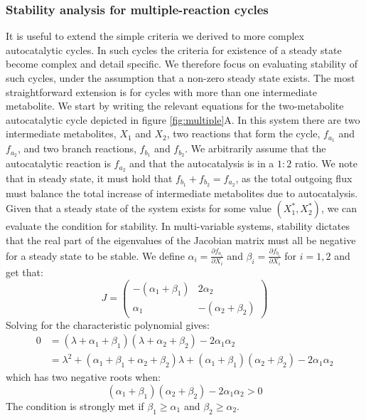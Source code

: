     \subsubsection{Stability analysis for multiple-reaction cycles}
    It is useful to extend the simple criteria we derived to more complex autocatalytic cycles.
    In such cycles the criteria for existence of a steady state become complex and detail specific.
    We therefore focus on evaluating stability of such cycles, under the assumption that a non-zero steady state exists.
    The most straightforward extension is for cycles with more than one intermediate metabolite.
    We start by writing the relevant equations for the two-metabolite autocatalytic cycle depicted in figure \ref{fig:multiple}A.
    In this system there are two intermediate metabolites, $X_1$ and $X_2$, two reactions that form the cycle, $f_{a_1}$ and $f_{a_2}$, and two branch reactions, $f_{b_1}$ and $f_{b_2}$.
    We arbitrarily assume that the autocatalytic reaction is $f_{a_2}$ and that the autocatalysis is in a $1:2$ ratio.
    We note that in steady state, it must hold that $f_{b_1}+f_{b_2}=f_{a_2}$, as the total outgoing flux must balance the total increase of intermediate metabolites due to autocatalysis.
    Given that a steady state of the system exists for some value $(X_1^*,X_2^*)$, we can evaluate the condition for stability.
    In multi-variable systems, stability dictates that the real part of the eigenvalues of the Jacobian matrix must all be negative for a steady state to be stable.
    We define $\alpha_i=\frac{\partial f_{a_i}}{\partial X_i}$ and $\beta_i=\frac{\partial f_{b_i}}{\partial X_i}$ for $i=1,2$ and get that:
    \begin{equation*}
        J=
        \begin{pmatrix}
            -(\alpha_1+\beta_1) & 2\alpha_2 \\
            \alpha_1 & -(\alpha_2+\beta_2)
        \end{pmatrix}
    \end{equation*}
    Solving for the characteristic polynomial gives:
    \begin{align*}
        0 & =(\lambda+\alpha_1+\beta_1)(\lambda+\alpha_2+\beta_2)-2\alpha_1\alpha_2 \\
        & = \lambda^2+(\alpha_1+\beta_1+\alpha_2+\beta_2)\lambda+(\alpha_1+\beta_1)(\alpha_2+\beta_2)-2\alpha_1\alpha_2
    \end{align*}
    which has two negative roots when:
    \begin{equation*}
        (\alpha_1+\beta_1)(\alpha_2+\beta_2)-2\alpha_1\alpha_2>0
    \end{equation*}
    The condition is strongly met if $\beta_1\geq \alpha_1$ and $\beta_2\geq\alpha_2$.
    
